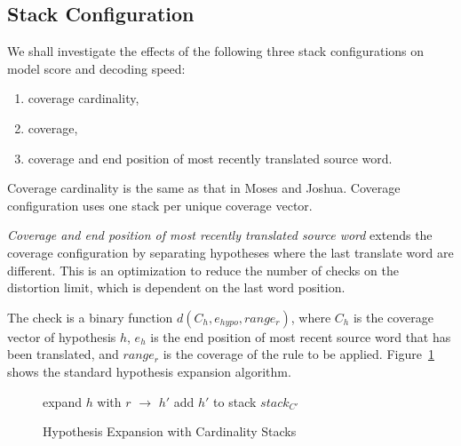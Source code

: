 \documentclass[]{article}
\begin{document}

\subsection{Stack Configuration}

We shall investigate the effects of the following three stack configurations on model score and decoding speed:
\begin{enumerate}
  \item \vspace{-2 mm} coverage cardinality,
  \item \vspace{-2 mm} coverage,
  \item \vspace{-2 mm} coverage and end position of most recently translated source word.
\end{enumerate}
Coverage cardinality is the same as that in Moses and Joshua. Coverage configuration uses one stack per unique coverage vector.

\emph{Coverage and end position of most recently translated source word} extends the coverage configuration by separating hypotheses where the last translate word are different. This is an optimization to reduce the number of checks on the distortion limit, which is dependent on the last word position. 

The check is a binary function $d(C_{h}, e_{hypo}, range_r)$, where $C_{h}$ is the coverage vector of hypothesis $h$, $e_{h}$ is the end position of most recent source word that has been translated, and $range_r$ is the coverage of the rule to be applied. Figure~\ref{algo:Hypothesis Expansion with Unsorted Stack} shows the standard hypothesis expansion algorithm.
\begin{figure} [h]
\begin{algorithmic}
	\STATE expand $h$ with $r$ $\rightarrow$ $h'$
	\STATE add $h'$ to stack $stack_{C'}$
      \ENDIF
  \ENDFOR %
\ENDFOR %
\end{algorithmic}
\caption{Hypothesis Expansion with Cardinality Stacks}
\label{algo:Hypothesis Expansion with Unsorted Stack}
\end{figure}
\end{document}
